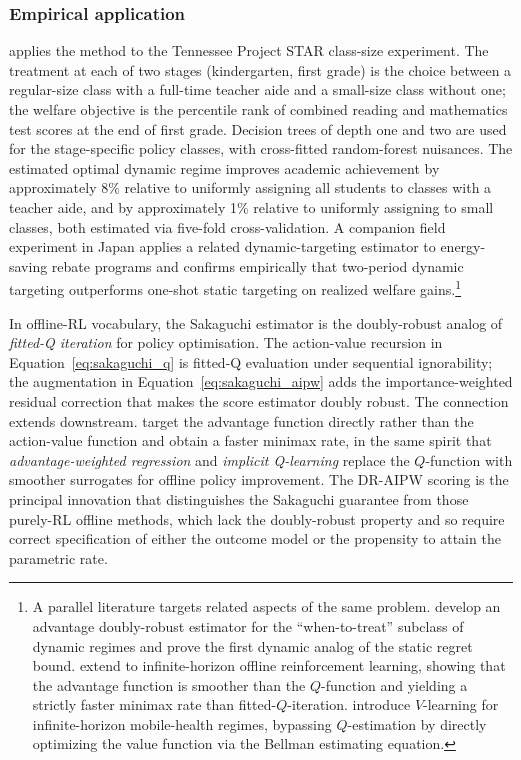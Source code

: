 \subsubsection*{Empirical application}

\citet[Section~7]{sakaguchi2024dynamicpolicy} applies the method to the Tennessee Project STAR class-size experiment. The treatment at each of two stages (kindergarten, first grade) is the choice between a regular-size class with a full-time teacher aide and a small-size class without one; the welfare objective is the percentile rank of combined reading and mathematics test scores at the end of first grade. Decision trees of depth one and two are used for the stage-specific policy classes, with cross-fitted random-forest nuisances. The estimated optimal dynamic regime improves academic achievement by approximately 8\% relative to uniformly assigning all students to classes with a teacher aide, and by approximately 1\% relative to uniformly assigning to small classes, both estimated via five-fold cross-validation. A companion field experiment in Japan \citep{idaIshiharaItoEtAl2024energyrebate} applies a related dynamic-targeting estimator to energy-saving rebate programs and confirms empirically that two-period dynamic targeting outperforms one-shot static targeting on realized welfare gains.\footnote{A parallel literature targets related aspects of the same problem. \citet{nie2021whentotreat} develop an advantage doubly-robust estimator for the ``when-to-treat'' subclass of dynamic regimes and prove the first dynamic analog of the \citet{athey2021policy} static regret bound. \citet{shi2024seal} extend to infinite-horizon offline reinforcement learning, showing that the advantage function is smoother than the $Q$-function and yielding a strictly faster minimax rate than fitted-$Q$-iteration. \citet{luckett2020vlearning} introduce $V$-learning for infinite-horizon mobile-health regimes, bypassing $Q$-estimation by directly optimizing the value function via the Bellman estimating equation.}

In offline-RL vocabulary, the Sakaguchi estimator is the doubly-robust analog of \emph{fitted-Q iteration} for policy optimisation. The action-value recursion in Equation~\eqref{eq:sakaguchi_q} is fitted-Q evaluation under sequential ignorability; the augmentation in Equation~\eqref{eq:sakaguchi_aipw} adds the importance-weighted residual correction that makes the score estimator doubly robust. The connection extends downstream. \citet{shi2024seal} target the advantage function directly rather than the action-value function and obtain a faster minimax rate, in the same spirit that \emph{advantage-weighted regression} and \emph{implicit Q-learning} replace the $Q$-function with smoother surrogates for offline policy improvement. The DR-AIPW scoring is the principal innovation that distinguishes the Sakaguchi guarantee from those purely-RL offline methods, which lack the doubly-robust property and so require correct specification of either the outcome model or the propensity to attain the parametric rate.

